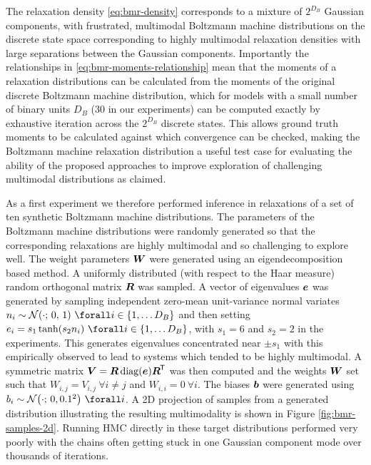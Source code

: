 The relaxation density \eqref{eq:bmr-density} corresponds to a mixture of $2^{D_B}$ Gaussian components, with frustrated, multimodal Boltzmann machine distributions on the discrete state space corresponding to highly multimodal relaxation densities with large separations between the Gaussian components. Importantly the relationships in \eqref{eq:bmr-moments-relationship} mean that the moments of a relaxation distributions can be calculated from the moments of the original discrete Boltzmann machine distribution, which for models with a small number of binary units $D_B$ (30 in our experiments) can be computed exactly by exhaustive iteration across the $2^{D_B}$ discrete states. This allows ground truth moments to be calculated against which convergence can be checked, making the Boltzmann machine relaxation distribution a useful test case for evaluating the ability of the proposed approaches to improve exploration of challenging multimodal distributions as claimed.

As a first experiment we therefore performed inference in relaxations of a set of ten synthetic Boltzmann machine distributions. The parameters of the Boltzmann machine distributions were randomly generated so that the corresponding relaxations are highly multimodal and so challenging to explore well. The weight parameters $\boldsymbol{W}$ were generated using an eigendecomposition based method. A uniformly distributed (with respect to the Haar measure) random orthogonal matrix $\boldsymbol{R}$ was sampled. A vector of eigenvalues $\boldsymbol{e}$ was generated by sampling independent zero-mean unit-variance normal variates $n_i \sim \nrm{\cdot;\,0,\,1} ~\forall i \in \fset{1,\dots D_B}$ and then setting $e_i = s_1 \tanh(s_2 n_i) ~\forall i \in \fset{1,\dots D_B}$, with $s_1 = 6$ and $s_2 = 2$ in the experiments. This generates eigenvalues concentrated near $\pm s_1$ with this empirically observed to lead to systems which tended to be highly multimodal. A symmetric matrix $\boldsymbol{V} = \boldsymbol{R}\operatorname{diag}(\boldsymbol{e})\boldsymbol{R}^{\mkern-1.5mu\mathsf{T}}$ was then computed and the weights $\boldsymbol{W}$ set such that $W_{i,j} = V_{i,j} ~\forall i \neq j$ and $W_{i,i} = 0 ~\forall i$. The biases $\boldsymbol{b}$ were generated using $b_i \sim \nrm{\cdot;\,0,0.1^2} ~\forall i$. A 2D projection of samples from a generated distribution illustrating the resulting multimodality is shown in Figure \ref{fig:bmr-samples-2d}. Running \ac{HMC} directly in these target distributions performed very poorly with the chains often getting stuck in one Gaussian component mode over thousands of iterations.

